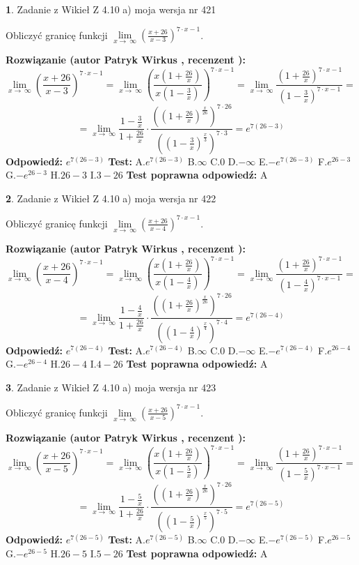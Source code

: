 \documentclass[12pt, a4paper]{article}
\theoremstyle{definition} %
\newtheorem{zad}{}
\newcommand{\zadStart}[1]{\begin{zad}#1\newline}
\newcommand{\zadStop}{\end{zad}}
\newcommand{\rozwStart}[2]{\noindent \textbf{Rozwiązanie (autor #1 , recenzent #2): }\newline}
\newcommand{\rozwStop}{\newline}
\newcommand{\odpStart}{\noindent \textbf{Odpowiedź:}\newline}
\newcommand{\odpStop}{\newline}
\newcommand{\testStart}{\noindent \textbf{Test:}\newline}
\newcommand{\testStop}{\newline}
\newcommand{\kluczStart}{\noindent \textbf{Test poprawna odpowiedź:}\newline}
\newcommand{\kluczStop}{\newline}
\begin{document}
\zadStart{Zadanie z Wikieł Z 4.10 a) moja wersja nr 421}


Obliczyć granicę funkcji  $\lim\limits_{x\to\ \infty}(\frac{x+26}{x-3})^{7\cdot x-1}$.
\zadStop
\rozwStart{Patryk Wirkus}{}
$$\lim\limits_{x\to\ \infty}(\frac{x+26}{x-3})^{7\cdot x-1} = \lim\limits_{x\to\ \infty}(\frac{x(1+\frac{26}{x})}{x(1-\frac{3}{x})})^{7\cdot x-1}=\lim\limits_{x\to\ \infty}\frac{(1+\frac{26}{x})^{7\cdot x-1}}{(1-\frac{3}{x})^{7\cdot x-1}}=$$
$$=\lim\limits_{x\to\ \infty}\frac{1-\frac{3}{x}}{1+\frac{26}{x}}\cdot\frac{((1+\frac{26}{x})^{\frac{x}{26}})^{7\cdot26}}{((1-\frac{3}{x})^{\frac{x}{3}})^{7\cdot3}}=e^{7(26-3)}$$
\rozwStop
\odpStart
$e^{7(26-3)}$
\odpStop
\testStart
A.$e^{7(26-3)}$ B.$\infty$ C.$0$ D.$-\infty$ E.$-e^{7(26-3)}$
F.$e^{26-3}$ G.$-e^{26-3}$
H.$26-3$
I.$3-26$
\testStop
\kluczStart
A
\kluczStop



\zadStart{Zadanie z Wikieł Z 4.10 a) moja wersja nr 422}


Obliczyć granicę funkcji  $\lim\limits_{x\to\ \infty}(\frac{x+26}{x-4})^{7\cdot x-1}$.
\zadStop
\rozwStart{Patryk Wirkus}{}
$$\lim\limits_{x\to\ \infty}(\frac{x+26}{x-4})^{7\cdot x-1} = \lim\limits_{x\to\ \infty}(\frac{x(1+\frac{26}{x})}{x(1-\frac{4}{x})})^{7\cdot x-1}=\lim\limits_{x\to\ \infty}\frac{(1+\frac{26}{x})^{7\cdot x-1}}{(1-\frac{4}{x})^{7\cdot x-1}}=$$
$$=\lim\limits_{x\to\ \infty}\frac{1-\frac{4}{x}}{1+\frac{26}{x}}\cdot\frac{((1+\frac{26}{x})^{\frac{x}{26}})^{7\cdot26}}{((1-\frac{4}{x})^{\frac{x}{4}})^{7\cdot4}}=e^{7(26-4)}$$
\rozwStop
\odpStart
$e^{7(26-4)}$
\odpStop
\testStart
A.$e^{7(26-4)}$ B.$\infty$ C.$0$ D.$-\infty$ E.$-e^{7(26-4)}$
F.$e^{26-4}$ G.$-e^{26-4}$
H.$26-4$
I.$4-26$
\testStop
\kluczStart
A
\kluczStop



\zadStart{Zadanie z Wikieł Z 4.10 a) moja wersja nr 423}


Obliczyć granicę funkcji  $\lim\limits_{x\to\ \infty}(\frac{x+26}{x-5})^{7\cdot x-1}$.
\zadStop
\rozwStart{Patryk Wirkus}{}
$$\lim\limits_{x\to\ \infty}(\frac{x+26}{x-5})^{7\cdot x-1} = \lim\limits_{x\to\ \infty}(\frac{x(1+\frac{26}{x})}{x(1-\frac{5}{x})})^{7\cdot x-1}=\lim\limits_{x\to\ \infty}\frac{(1+\frac{26}{x})^{7\cdot x-1}}{(1-\frac{5}{x})^{7\cdot x-1}}=$$
$$=\lim\limits_{x\to\ \infty}\frac{1-\frac{5}{x}}{1+\frac{26}{x}}\cdot\frac{((1+\frac{26}{x})^{\frac{x}{26}})^{7\cdot26}}{((1-\frac{5}{x})^{\frac{x}{5}})^{7\cdot5}}=e^{7(26-5)}$$
\rozwStop
\odpStart
$e^{7(26-5)}$
\odpStop
\testStart
A.$e^{7(26-5)}$ B.$\infty$ C.$0$ D.$-\infty$ E.$-e^{7(26-5)}$
F.$e^{26-5}$ G.$-e^{26-5}$
H.$26-5$
I.$5-26$
\testStop
\kluczStart
A
\kluczStop
\end{document}
